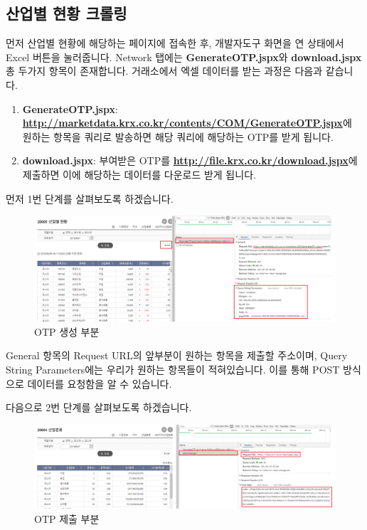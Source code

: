 \documentclass[]{book}
\begin{document}
\hypertarget{section-19}{%
\subsection{산업별 현황 크롤링}\label{section-19}}

먼저 산업별 현황에 해당하는 페이지에 접속한 후, 개발자도구 화면을 연 상태에서 Excel 버튼을 눌러줍니다. Network 탭에는 \textbf{GenerateOTP.jspx}와 \textbf{download.jspx} 총 두가지 항목이 존재합니다. 거래소에서 엑셀 데이터를 받는 과정은 다음과 같습니다.

\begin{enumerate}
\def\labelenumi{\arabic{enumi}.}
\item
  \textbf{GenerateOTP.jspx}: \textbf{\url{http://marketdata.krx.co.kr/contents/COM/GenerateOTP.jspx}}에 원하는 항목을 쿼리로 발송하면 해당 쿼리에 해당하는 OTP를 받게 됩니다.
\item
  \textbf{download.jspx}: 부여받은 OTP를 \textbf{\url{http://file.krx.co.kr/download.jspx}}에 제출하면 이에 해당하는 데이터를 다운로드 받게 됩니다.
\end{enumerate}

먼저 1번 단계를 살펴보도록 하겠습니다.

\begin{figure}

{\centering \includegraphics[width=1\linewidth]{images/crawl_practice_krx_sector} 

}

\caption{OTP 생성 부분}\label{fig:unnamed-chunk-1}
\end{figure}

General 항목의 Request URL의 앞부분이 원하는 항목을 제출할 주소이며, Query String Parameters에는 우리가 원하는 항목들이 적혀있습니다. 이를 통해 POST 방식으로 데이터를 요청함을 알 수 있습니다.

다음으로 2번 단계를 살펴보도록 하겠습니다.

\begin{figure}

{\centering \includegraphics[width=1\linewidth]{images/crawl_practice_krx_sector2} 

}

\caption{OTP 제출 부분}\label{fig:unnamed-chunk-2}
\end{figure}
\end{document}
